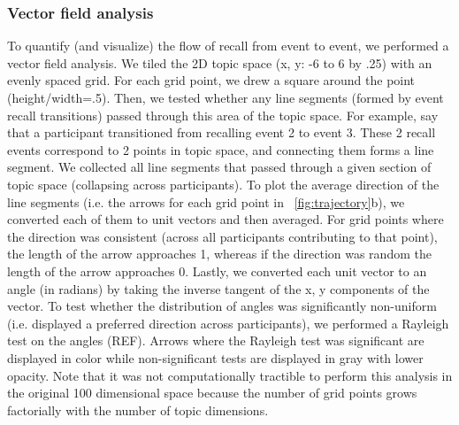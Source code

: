 \documentclass{article}
\begin{document}
{\subsubsection{Vector field analysis}
To quantify (and visualize) the flow of recall from event to event, we performed a vector field analysis.  We tiled the 2D topic space (x, y: -6 to 6 by .25) with an evenly spaced grid. For each grid point, we drew a square around the point (height/width=.5). Then, we tested whether any line segments (formed by event recall transitions) passed through this area of the topic space.  For example, say that a participant transitioned from recalling event 2 to event 3. These 2 recall events correspond to 2 points in topic space, and connecting them forms a line segment. We collected all line segments that passed through a given section of topic space (collapsing across participants). To plot the average direction of the line segments (i.e. the arrows for each grid point in ~\ref{fig:trajectory}b), we converted each of them to unit vectors and then averaged. For grid points where the direction was consistent (across all participants contributing to that point), the length of the arrow approaches 1, whereas if the direction was random the length of the arrow approaches 0. Lastly, we converted each unit vector to an angle (in radians) by taking the inverse tangent of the x, y components of the vector. To test whether the distribution of angles was significantly non-uniform (i.e. displayed a preferred direction across participants), we performed a Rayleigh test on the angles (REF). Arrows where the Rayleigh test was significant are displayed in color while non-significant tests are displayed in gray with lower opacity. Note that it was not computationally tractible to perform this analysis in the original 100 dimensional space because the number of grid points grows factorially with the number of topic dimensions.


}
\end{document}
